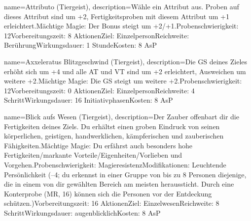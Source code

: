 {
    name={Attributo (Tiergeist)},
    description={Wähle ein Attribut aus. Proben auf dieses Attribut sind um +2, Fertigkeitsproben mit diesem Attribut um +1 erleichtert.\newline Mächtige Magie: Der Bonus steigt um +2/+1.\newline Probenschwierigkeit: 12\newline Vorbereitungszeit: 8 Aktionen\newline Ziel: Einzelperson\newline Reichweite: Berührung\newline Wirkungsdauer: 1 Stunde\newline Kosten: 8 AsP}
}


{
    name={Axxeleratus Blitzgeschwind (Tiergeist)},
    description={Die GS deines Zieles erhöht sich um +4 und alle AT und VT sind um +2 erleichtert, Ausweichen um weitere +2.\newline Mächtige Magie: Die GS steigt um weitere +2.\newline Probenschwierigkeit: 12\newline Vorbereitungszeit: 0 Aktionen\newline Ziel: Einzelperson\newline Reichweite: 4 Schritt\newline Wirkungsdauer: 16 Initiativphasen\newline Kosten: 8 AsP}
}


{
    name={Blick aufs Wesen (Tiergeist)},
    description={Der Zauber offenbart dir die Fertigkeiten deines Ziels. Du erhältst einen groben Eindruck von seinen körperlichen, geistigen, handwerklichen, kämpferischen und zauberischen Fähigkeiten.\newline Mächtige Magie: Du erfährst auch besonders hohe Fertigkeiten/markante Vorteile/Eigenheiten/Vorlieben und Vorgehen.\newline Probenschwierigkeit: Magieresistenz\newline Modifikationen: Leuchtende Persönlichkeit (–4; du erkennst in einer Gruppe von bis zu 8 Personen diejenige, die in einem von dir gewählten Bereich am meisten heraussticht. Durch eine Konterprobe (MR, 16) können sich die Personen vor der Entdeckung schützen.)\newline Vorbereitungszeit: 16 Aktionen\newline Ziel: Einzelwesen\newline Reichweite: 8 Schritt\newline Wirkungsdauer: augenblicklich\newline Kosten: 8 AsP}
}


